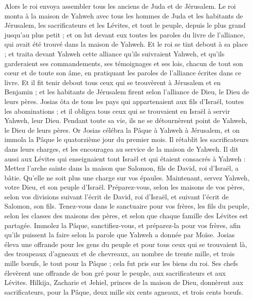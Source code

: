 \begin{multicols}{2}
Alors le roi envoya assembler tous les anciens de Juda et de Jérusalem.
Le roi monta à la maison de Yahweh avec tous les hommes de Juda et les habitants de Jérusalem, les sacrificateurs et les Lévites, et tout le peuple, depuis le plus grand jusqu'au plus petit ; et on lut devant eux toutes les paroles du livre de l'alliance, qui avait été trouvé dans la maison de Yahweh.
Et le roi se tint debout à sa place ; et traita devant Yahweh cette alliance qu'ils suivraient Yahweh, et qu'ils garderaient ses commandements, ses témoignages et ses lois, chacun de tout son cœur et de toute son âme, en pratiquant les paroles de l'alliance écrites dans ce livre.
Et il fit tenir debout tous ceux qui se trouvèrent à Jérusalem et en Benjamin ; et les habitants de Jérusalem firent selon l'alliance de Dieu, le Dieu de leurs pères.
Josias ôta de tous les pays qui appartenaient aux fils d’Israël, toutes les abominations ; et il obligea tous ceux qui se trouvaient en Israël à servir Yahweh, leur Dieu. Pendant toute sa vie, ils ne se détournèrent point de Yahweh, le Dieu de leurs pères.
\VerseOne{}Or Josias célébra la Pâque à Yahweh à Jérusalem, et on immola la Pâque le quatorzième jour du premier mois.
Il rétablit les sacrificateurs dans leurs charges, et les encouragea au service de la maison de Yahweh.
Il dit aussi aux Lévites qui enseignaient tout Israël et qui étaient consacrés à Yahweh : Mettez l'arche sainte dans la maison que Salomon, fils de David, roi d'Israël, a bâtie. Qu’elle ne soit plus une charge sur vos épaules. Maintenant, servez Yahweh, votre Dieu, et son peuple d'Israël.
Préparez-vous, selon les maisons de vos pères, selon vos divisions suivant l'écrit de David, roi d'Israël, et suivant l'écrit de Salomon, son fils.
Tenez-vous dans le sanctuaire pour vos frères, les fils du peuple, selon les classes des maisons des pères, et selon que chaque famille des Lévites est partagée.
Immolez la Pâque, sanctifiez-vous, et préparez-la pour vos frères, afin qu'ils puissent la faire selon la parole que Yahweh a donnée par Moïse.
Josias éleva une offrande pour les gens du peuple et pour tous ceux qui se trouvaient là, des troupeaux d’agneaux et de chevreaux, au nombre de trente mille, et trois mille bœufs, le tout pour la Pâque ; cela fut pris sur les biens du roi.
Ses chefs élevèrent une offrande de bon gré pour le peuple, aux sacrificateurs et aux Lévites. Hilkija, Zacharie et Jehiel, princes de la maison de Dieu, donnèrent aux sacrificateurs, pour la Pâque, deux mille six cents agneaux, et trois cents bœufs.

\end{multicols}
